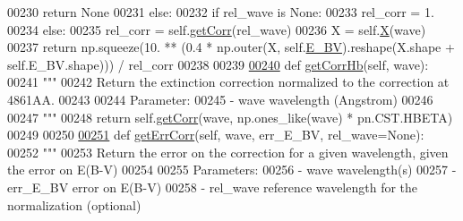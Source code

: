 \begin{DoxyCode}
00230             \textcolor{keywordflow}{return} \textcolor{keywordtype}{None}
00231         \textcolor{keywordflow}{else}:
00232             \textcolor{keywordflow}{if} rel\_wave \textcolor{keywordflow}{is} \textcolor{keywordtype}{None}:
00233                 rel\_corr = 1.
00234             \textcolor{keywordflow}{else}:
00235                 rel\_corr = self.\hyperlink{classpyneb_1_1extinction_1_1red__corr_1_1_red_corr_a4fd27cfde692dbe6f3ff3d039bde2929}{getCorr}(rel\_wave) 
00236             X = self.\hyperlink{classpyneb_1_1extinction_1_1red__corr_1_1_red_corr_aac92bb80311cda78c01e61aa44655251}{X}(wave)
00237             \textcolor{keywordflow}{return} np.squeeze(10. ** (0.4 * np.outer(X, self.\hyperlink{classpyneb_1_1extinction_1_1red__corr_1_1_red_corr_a0bc581bcaa8eeeb67b83ffdec58bf164}{E\_BV}).reshape(X.shape + self.E\_BV.shape)))
       / rel\_corr
00238     
00239     
\hypertarget{red__corr_8py_source_l00240}{}\hyperlink{classpyneb_1_1extinction_1_1red__corr_1_1_red_corr_a5a570e787f6fe64d23e34b5646e46b6c}{00240}     \textcolor{keyword}{def }\hyperlink{classpyneb_1_1extinction_1_1red__corr_1_1_red_corr_a5a570e787f6fe64d23e34b5646e46b6c}{getCorrHb}(self, wave):
00241         \textcolor{stringliteral}{"""}
00242 \textcolor{stringliteral}{        Return the extinction correction normalized to the correction at 4861AA.}
00243 \textcolor{stringliteral}{            }
00244 \textcolor{stringliteral}{        Parameter:}
00245 \textcolor{stringliteral}{            - wave      wavelength (Angstrom)}
00246 \textcolor{stringliteral}{        }
00247 \textcolor{stringliteral}{        """}
00248         \textcolor{keywordflow}{return} self.\hyperlink{classpyneb_1_1extinction_1_1red__corr_1_1_red_corr_a4fd27cfde692dbe6f3ff3d039bde2929}{getCorr}(wave, np.ones\_like(wave) * pn.CST.HBETA)
00249     
00250     
\hypertarget{red__corr_8py_source_l00251}{}\hyperlink{classpyneb_1_1extinction_1_1red__corr_1_1_red_corr_a6e7097b97a6552f30422884af3faff69}{00251}     \textcolor{keyword}{def }\hyperlink{classpyneb_1_1extinction_1_1red__corr_1_1_red_corr_a6e7097b97a6552f30422884af3faff69}{getErrCorr}(self, wave, err\_E\_BV, rel\_wave=None):
00252         \textcolor{stringliteral}{"""}
00253 \textcolor{stringliteral}{        Return the error on the correction for a given wavelength, given the error on E(B-V)}
00254 \textcolor{stringliteral}{        }
00255 \textcolor{stringliteral}{        Parameters:}
00256 \textcolor{stringliteral}{            - wave         wavelength(s)}
00257 \textcolor{stringliteral}{            - err\_E\_BV     error on E(B-V)}
00258 \textcolor{stringliteral}{            - rel\_wave     reference wavelength for the normalization (optional)}

\end{DoxyCode}
